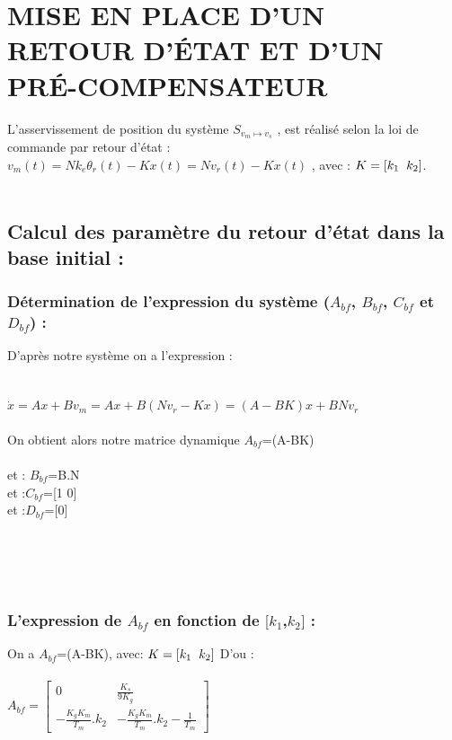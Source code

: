 

 \chapter{MISE EN PLACE D’UN RETOUR D’ÉTAT ET D’UN PRÉ-COMPENSATEUR}

L'asservissement de position du système $S_{v_{m}\longmapsto v_{s}}$ , est réalisé selon la loi de commande par retour d'état :\\
 $v_{m}(t)=Nk_{e}\theta_{r}(t)-Kx(t)=Nv_{r}(t)-Kx(t)$ , avec : $K=[k_{1} \hspace{2mm} k_{2}]$.\\\\
 
 \section{Calcul des paramètre du retour d'état dans la base initial :}
 
\subsection{Détermination de l'expression du système ($A_{bf}$, $B_{bf}$, $C_{bf}$ et $D_{bf}$) :}

D'après notre système on a l'expression :\\
\\\\
$\dot{x}=Ax+Bv_{m}=Ax+B(Nv_{r}-Kx)=(A-BK)x+BNv_{r}$
\\\\
On obtient alors notre matrice dynamique \quad $A_{bf}$=(A-BK)\\
\\
et : \quad $B_{bf}$=B.N \\
 et :\quad $C_{bf}$=[1 0] \\
 et :\quad $D_{bf}$=[0] \\\\\\\\\\

\subsection{L'expression de $A_{bf}$ en fonction de $[k_{1}$,$k_{2}]$ : }

On a $A_{bf}$=(A-BK),  avec: $K=[k_{1} \hspace{2mm} k_{2}]$
D'ou :\\\\
$A_{bf}=
\begin{bmatrix} 
0 & \frac{K_{s}}{9K_{g}} \\
-\frac{K_{g}K_{m}}{T_{m}}.k_{2} & -\frac{K_{g}K_{m}}{T_{m}}.k_{2}-\frac{1}{T_{m}}
\end{bmatrix}$ \\\\

